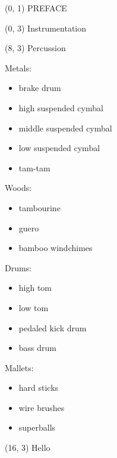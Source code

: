 \documentclass[10pt]{article}
\begin{document}
\begin{textblock}{23} (0, 1)
\center\huge PREFACE
\end{textblock}

\begin{textblock}{7} (0, 3)
Instrumentation
\end{textblock}

\begin{textblock}{7} (8, 3)
Percussion

Metals:

\begin{itemize}
    \item brake drum
    \item high suspended cymbal 
    \item middle suspended cymbal
    \item low suspended cymbal
    \item tam-tam
\end{itemize}

Woods:

\begin{itemize}
    \item tambourine
    \item guero
    \item bamboo windchimes
\end{itemize}

Drums:

\begin{itemize}
    \item high tom
    \item low tom
    \item pedaled kick drum
    \item bass drum
\end{itemize}

Mallets:

\begin{itemize}
    \item hard sticks
    \item wire brushes
    \item superballs
\end{itemize}

\end{textblock}

\begin{textblock}{7} (16, 3)
Hello
\end{textblock}
\end{document}
